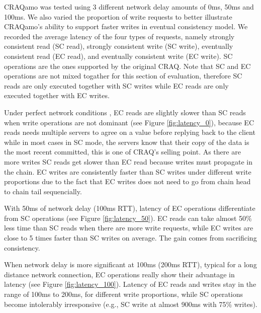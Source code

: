 CRAQamo was tested using 3 different network delay amounts of 0ms, 50ms and 100ms. We also varied the proportion of write requests to better illustrate CRAQamo's ability to support faster writes in eventual consistency model. We recorded the average latency of the four types of requests, namely strongly consistent read (SC read), strongly consistent write (SC write), eventually consistent read (EC read), and eventually consistent write (EC write). SC operations are the ones supported by the original CRAQ. Note that SC and EC operations are not mixed togather for this section of evaluation, therefore SC reads are only executed together with SC writes while EC reads are only executed together with EC writes. 

Under perfect network conditions , EC reads are slightly slower than SC reads when write operations are not dominant (see Figure \ref{fig:latency_0}), because EC reads needs multiple servers to agree on a value before replying back to the client while in most cases in SC mode, the servers know that their copy of the data is the most recent committed, this is one of CRAQ's selling point. As there are more writes SC reads get slower than EC read because writes must propagate in the chain. EC writes are consistently faster than SC writes under different write proportions due to the fact that EC writes does not need to go from chain head to chain tail sequencially.

With 50ms of network delay (100ms RTT), latency of EC operations differentiate from SC operations  (see Figure \ref{fig:latency_50}). EC reads can take almost 50\% less time than SC reads when there are more write requests, while EC writes are close to 5 times faster than SC writes on average. The gain comes from sacrificing consistency.

When network delay is more significant at 100ms (200ms RTT), typical for a long distance network connection, EC operations really show their advantage in latency  (see Figure \ref{fig:latency_100}). Latency of EC reads and writes stay in the range of 100ms to 200ms, for different write proportions, while SC operations become intolerably irresponsive (e.g., SC write at almost 900ms with 75\% writes).

